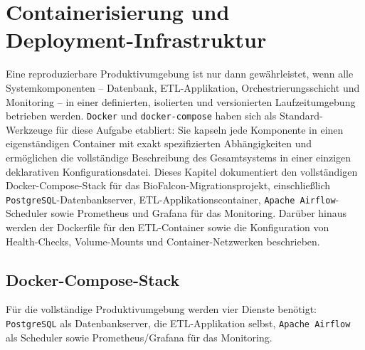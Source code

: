 \documentclass[12pt,a4paper]{report}
\theoremstyle{definition}
\theoremstyle{remark}
\newcommand{\pg}{\texttt{PostgreSQL}}
\newcommand{\airflow}{\texttt{Apache Airflow}}
\newcommand{\docker}{\texttt{Docker}}
\newcommand{\code}[1]{\texttt{#1}}
\begin{document}
\chapter{Containerisierung und Deployment-Infrastruktur}
\label{sec:docker}

Eine reproduzierbare Produktivumgebung ist nur dann gewährleistet, wenn alle Systemkomponenten -- Datenbank, ETL-Applikation, Orchestrierungsschicht und Monitoring -- in einer definierten, isolierten und versionierten Laufzeitumgebung betrieben werden. \docker{} und \code{docker-compose} haben sich als Standard-Werkzeuge für diese Aufgabe etabliert: Sie kapseln jede Komponente in einen eigenständigen Container mit exakt spezifizierten Abhängigkeiten und ermöglichen die vollständige Beschreibung des Gesamtsystems in einer einzigen deklarativen Konfigurationsdatei. Dieses Kapitel dokumentiert den vollständigen Docker-Compose-Stack für das BioFalcon-Migrationsprojekt, einschließlich \pg{}-Datenbankserver, ETL-Applikationscontainer, \airflow{}-Scheduler sowie Prometheus und Grafana für das Monitoring. Darüber hinaus werden der Dockerfile für den ETL-Container sowie die Konfiguration von Health-Checks, Volume-Mounts und Container-Netzwerken beschrieben.

\section{Docker-Compose-Stack}

Für die vollständige Produktivumgebung werden vier Dienste ben\"otigt:
\pg{} als Datenbankserver, die ETL-Applikation selbst, \airflow{}
als Scheduler sowie Prometheus/Grafana für das Monitoring.
\end{document}
